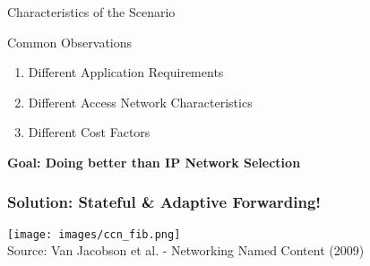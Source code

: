 \begin{frame}{Characteristics of the Scenario}
	\vspace*{-1em}
	\begin{block}{Common Observations}
		\begin{enumerate}
			\item Different Application Requirements
			\item Different Access Network Characteristics
			\item Different Cost Factors
		\end{enumerate}
	\end{block}
	\textbf{Goal: Doing better than IP Network Selection}
\end{frame}

\begin{frame}
	\frametitle{Solution: Stateful \& Adaptive Forwarding!}
	\vspace{-2em}
	\centering
	\texttt{[image: images/ccn\_fib.png]}\\[.6em]
	
	\scriptsize
	Source: Van Jacobson et al. - Networking Named Content (2009)
\end{frame}












